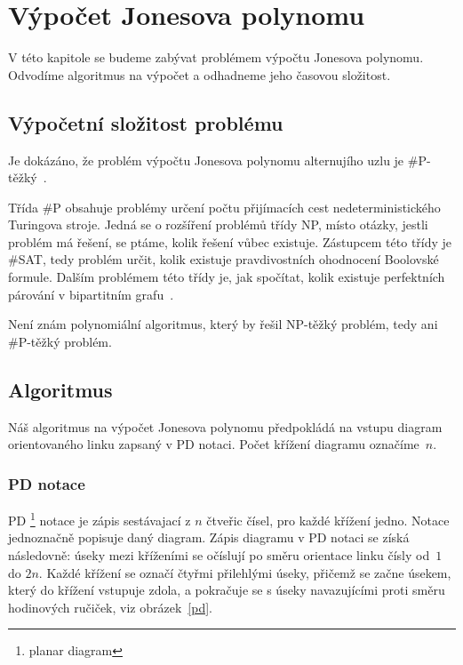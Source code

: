 \chapter{Výpočet Jonesova polynomu}

V této kapitole se budeme zabývat problémem výpočtu Jonesova polynomu. Odvodíme algoritmus na výpočet a odhadneme jeho časovou složitost.

\section{Výpočetní složitost problému} 

Je dokázáno, že problém výpočtu Jonesova polynomu alternujího uzlu je \mbox{\#P-těžký}~\cite{jaeger_vertigan_welsh_1990}. 

Třída \#P obsahuje problémy určení počtu přijímacích cest nedeterministického Turingova stroje. Jedná se o rozšíření problémů třídy NP, místo otázky, jestli problém má řešení, se ptáme, kolik řešení vůbec existuje. Zástupcem této třídy je \#SAT, tedy problém určit, kolik existuje pravdivostních ohodnocení Boolovské formule. Dalším problémem této třídy je, jak spočítat, kolik  existuje perfektních párování v bipartitním grafu~\cite{zoo}.

Není znám polynomiální algoritmus, který by řešil NP-těžký problém, tedy ani \#P-těžký problém.

\section{Algoritmus}
Náš algoritmus na výpočet Jonesova polynomu předpokládá na vstupu diagram orientovaného linku zapsaný v PD notaci. Počet křížení diagramu označíme~$n$.

\subsection{PD notace} 

PD \footnote{planar diagram} notace je zápis sestávajací z $n$  čtveřic čísel, pro každé křížení jedno. Notace jednoznačně popisuje daný diagram. Zápis diagramu v PD notaci se získá následovně: úseky mezi kříženími se očíslují po směru orientace linku čísly od~$1$ do $2 n$. Každé křížení se označí čtyřmi přilehlými úseky, přičemž se začne úsekem, který do křížení vstupuje zdola, a pokračuje se s úseky navazujícími proti směru hodinových ručiček, viz obrázek~\ref{pd}.

